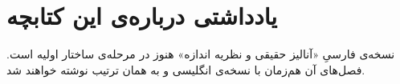 \chapter*{یادداشتی درباره‌ی این کتابچه}

نسخه‌ی فارسیِ «آنالیز حقیقی و نظریه اندازه» هنوز در مرحله‌ی ساختار اولیه است. فصل‌های آن هم‌زمان با نسخه‌ی انگلیسی و به همان ترتیب نوشته خواهند شد.
